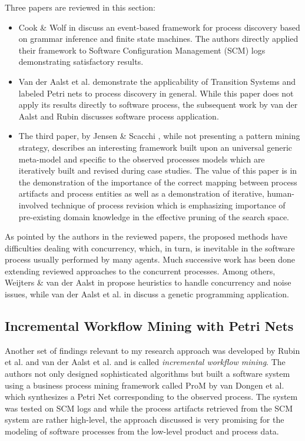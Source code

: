 Three papers are reviewed in this section: 
\begin{itemize}
	\item Cook \& Wolf in \cite{citeulike:328044} discuss an event-based framework for process discovery based on grammar inference and finite state machines. The authors directly applied their framework to Software Configuration Management (SCM) logs demonstrating satisfactory results. 
	\item Van der Aalst et al. \cite{citeulike:3718014} demonstrate the applicability of Transition Systems and labeled Petri nets to process discovery in general. While this paper does not apply its results directly to software process, the subsequent work by van der Aalst and Rubin \cite{citeulike:1885717} discusses software process application.
	\item The third paper, by Jensen \& Scacchi \cite{citeulike:5043664}, while not presenting a pattern mining strategy, describes an interesting framework built upon an universal generic meta-model and specific to the observed processes models which are iteratively built and revised during case studies. The value of this paper is in the demonstration of the importance of the correct mapping between process artifacts and process entities as well as a demonstration of iterative, human-involved technique of process revision which is emphasizing importance of pre-existing domain knowledge in the effective pruning of the search space.
\end{itemize}
As pointed by the authors in the reviewed papers, the proposed methods have difficulties dealing with concurrency, which, in turn, is inevitable in the software process usually performed by many agents. Much successive work has been done extending reviewed approaches to the concurrent processes. Among others, Weijters \& van der Aalst in \cite{citeulike:5128101} propose heuristics to handle concurrency and noise issues, while van der Aalst et al. in \cite{citeulike:5128110} discuss a genetic programming application. 

\subsection{Incremental Workflow Mining with Petri Nets}
Another set of findings relevant to my research approach was developed by Rubin
et al. \cite{citeulike:1885717} and van der Aalst et al.
\cite{citeulike:3718014} and is called \textit{incremental workflow mining}. The
authors not only designed sophisticated algorithms but built a software system
using a business process mining framework called ProM by van Dongen et al.
\cite{citeulike:5043673} which synthesizes a Petri Net corresponding to the
observed process. The system was tested on SCM logs and while the process
artifacts retrieved from the SCM system are rather high-level, the approach
discussed is very promising for the modeling of software processes from the
low-level product and process data.

